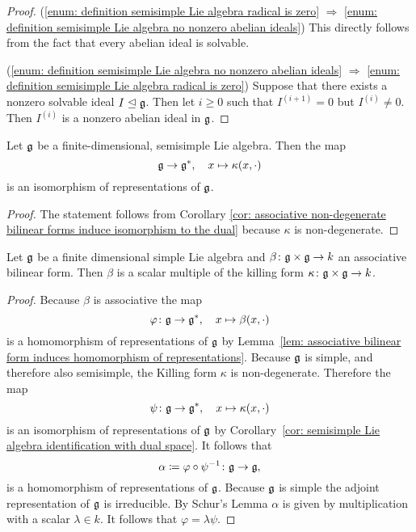\begin{proof}
 (\ref{enum: definition semisimple Lie algebra radical is zero} $\Rightarrow$ \ref{enum: definition semisimple Lie algebra no nonzero abelian ideals}) This directly follows from the fact that every abelian ideal is solvable.
 
 (\ref{enum: definition semisimple Lie algebra no nonzero abelian ideals} $\Rightarrow$ \ref{enum: definition semisimple Lie algebra radical is zero}) Suppose that there exists a nonzero solvable ideal $I \trianglelefteq \mathfrak{g}$. Then let $i \geq 0$ such that $I^{(i+1)} = 0$ but $I^{(i)} \neq 0$. Then $I^{(i)}$ is a nonzero abelian ideal in $\mathfrak{g}$.
\end{proof}


\begin{cor}\label{cor: semisimple Lie algebra identification with dual space}
 Let $\mathfrak{g}$ be a finite-dimensional, semisimple Lie algebra. Then the map
 \[
  \mathfrak{g} \to \mathfrak{g}^*, \quad x \mapsto \kappa(x,\cdot)
 \]
 is an isomorphism of representations of $\mathfrak{g}$.
\end{cor}
\begin{proof}
 The statement follows from Corollary \ref{cor: associative non-degenerate bilinear forms induce isomorphism to the dual} because $\kappa$ is non-degenerate.
\end{proof}


\begin{cor}
 Let $\mathfrak{g}$ be a finite dimensional simple Lie algebra and $\beta \colon \mathfrak{g} \times \mathfrak{g} \to k$ an associative bilinear form. Then $\beta$ is a scalar multiple of the killing form $\kappa \colon \mathfrak{g} \times \mathfrak{g} \to k$.
\end{cor}
\begin{proof}
 Because $\beta$ is associative the map
 \[
  \varphi \colon \mathfrak{g} \to \mathfrak{g}^*, \quad x \mapsto \beta(x, \cdot)
 \]
 is a homomorphism of representations of $\mathfrak{g}$ by Lemma~\ref{lem: associative bilinear form induces homomorphism of representations}. Because $\mathfrak{g}$ is simple, and therefore also semisimple, the Killing form $\kappa$ is non-degenerate. Therefore the map
 \[
  \psi \colon \mathfrak{g} \to \mathfrak{g}^*, \quad x \mapsto \kappa(x, \cdot)
 \]
 is an isomorphism of representations of $\mathfrak{g}$ by Corollary~\ref{cor: semisimple Lie algebra identification with dual space}. It follows that
 \[
  \alpha \coloneqq \varphi \circ \psi^{-1} \colon \mathfrak{g} \to \mathfrak{g}, 
 \]
 is a homomorphism of representations of $\mathfrak{g}$. Because $\mathfrak{g}$ is simple the adjoint representation of $\mathfrak{g}$ is irreducible. By Schur’s Lemma $\alpha$ is given by multiplication with a scalar $\lambda \in k$. It follows that $\varphi = \lambda \psi$.
\end{proof}



